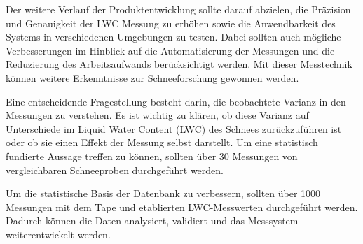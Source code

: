 Der weitere Verlauf der Produktentwicklung sollte darauf abzielen, die Präzision und Genauigkeit der LWC Messung  zu erhöhen sowie die Anwendbarkeit des Systems in verschiedenen Umgebungen zu testen. Dabei sollten auch mögliche Verbesserungen im Hinblick auf die Automatisierung der Messungen und die Reduzierung des Arbeitsaufwands berücksichtigt werden. Mit dieser Messtechnik können weitere Erkenntnisse zur Schneeforschung gewonnen werden. 

Eine entscheidende Fragestellung besteht darin, die beobachtete Varianz in den Messungen zu verstehen. Es ist wichtig zu klären, ob diese Varianz auf Unterschiede im Liquid Water Content (LWC) des Schnees zurückzuführen ist oder ob sie einen Effekt der Messung selbst darstellt. Um eine statistisch fundierte Aussage treffen zu können, sollten über 30 Messungen von vergleichbaren Schneeproben durchgeführt werden.

Um die statistische Basis der Datenbank zu verbessern, sollten über 1000 Messungen mit dem Tape und etablierten LWC-Messwerten durchgeführt werden. Dadurch können die Daten analysiert, validiert und das Messsystem weiterentwickelt werden.
